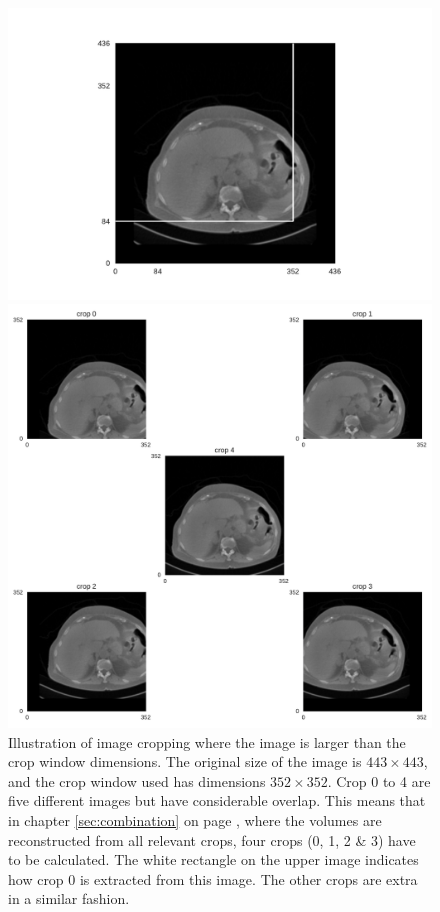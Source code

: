 \begin{figure}
    \centering
    \begin{minipage}{.99\textwidth}
        \includegraphics[width=.99\textwidth]{images/slice017.pdf}
    \end{minipage} 
    \begin{minipage}{0.99\textwidth}
        \includegraphics[width=.99\textwidth]{images/cropping_slice017.pdf}
    \end{minipage}
    \caption{
        Illustration of image cropping where the image is larger than the crop window dimensions. The original size of the image is $443 \times 443$, and the crop window used has dimensions $352 \times 352$.
        Crop 0 to 4 are five different images but have considerable overlap. This means that in chapter \ref{sec:combination} on page \pageref{sec:combination}, 
        where the volumes are reconstructed from all relevant crops, four crops (0, 1, 2 \& 3) have to be calculated.
        The white rectangle on the upper image indicates how crop 0 is extracted from this image. The other crops are extra in a similar fashion.
        \label{fig:crop}
        }
    
\end{figure}

